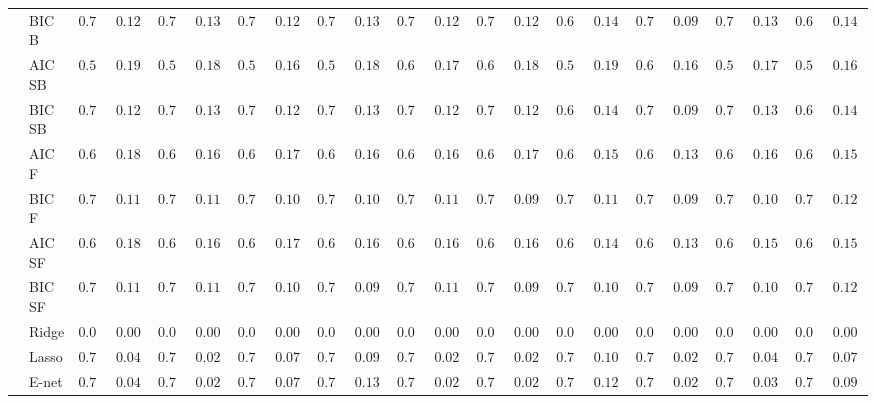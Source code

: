 \begin{tabular}{p{0.2cm}p{1cm}|p{0.6cm}p{0.6cm}|p{0.6cm}p{0.6cm}p{0.6cm}p{0.6cm}p{0.6cm}p{0.6cm}|p{0.6cm}p{0.6cm}p{0.6cm}p{0.6cm}p{0.6cm}p{0.6cm}|p{0.6cm}p{0.6cm}p{0.6cm}p{0.6cm}p{0.6cm}p{0.6cm}}
 & BIC B  & $0.720$ & $0.1271$ & $0.706$ & $0.1347$ & $0.700$ & $0.1287$ & $0.700$ & $0.1318$ & $0.740$ & $0.1223$ & $0.732$ & $0.1246$ & $0.690$ & $0.1432$ & $0.744$ & $0.0988$ & $0.706$ & $0.1347$ & $0.688$ & $0.1402$ \\
 & AIC SB  & $0.594$ & $0.1979$ & $0.578$ & $0.1883$ & $0.588$ & $0.1677$ & $0.590$ & $0.1829$ & $0.612$ & $0.1725$ & $0.634$ & $0.1821$ & $0.568$ & $0.1943$ & $0.642$ & $0.1615$ & $0.584$ & $0.1791$ & $0.588$ & $0.1629$ \\
 & BIC SB  & $0.720$ & $0.1271$ & $0.706$ & $0.1347$ & $0.700$ & $0.1287$ & $0.700$ & $0.1318$ & $0.740$ & $0.1223$ & $0.730$ & $0.1283$ & $0.690$ & $0.1432$ & $0.744$ & $0.0988$ & $0.704$ & $0.1348$ & $0.686$ & $0.1400$ \\
 & AIC F  & $0.620$ & $0.1853$ & $0.614$ & $0.1688$ & $0.620$ & $0.1764$ & $0.662$ & $0.1674$ & $0.624$ & $0.1615$ & $0.664$ & $0.1703$ & $0.654$ & $0.1500$ & $0.676$ & $0.1357$ & $0.642$ & $0.1615$ & $0.626$ & $0.1574$ \\
 & BIC F  & $0.734$ & $0.1174$ & $0.722$ & $0.1133$ & $0.734$ & $0.1066$ & $0.738$ & $0.1013$ & $0.750$ & $0.1115$ & $0.750$ & $0.0959$ & $0.724$ & $0.1129$ & $0.748$ & $0.0926$ & $0.738$ & $0.1013$ & $0.714$ & $0.1215$ \\
 & AIC SF  & $0.622$ & $0.1840$ & $0.616$ & $0.1674$ & $0.622$ & $0.1750$ & $0.664$ & $0.1630$ & $0.622$ & $0.1630$ & $0.666$ & $0.1683$ & $0.658$ & $0.1458$ & $0.678$ & $0.1330$ & $0.646$ & $0.1553$ & $0.628$ & $0.1558$ \\
 & BIC SF  & $0.734$ & $0.1174$ & $0.722$ & $0.1133$ & $0.734$ & $0.1066$ & $0.740$ & $0.0964$ & $0.750$ & $0.1115$ & $0.750$ & $0.0959$ & $0.726$ & $0.1088$ & $0.748$ & $0.0926$ & $0.738$ & $0.1013$ & $0.714$ & $0.1215$ \\
 & Ridge  & $0.000$ & $0.0000$ & $0.000$ & $0.0000$ & $0.000$ & $0.0000$ & $0.000$ & $0.0000$ & $0.000$ & $0.0000$ & $0.000$ & $0.0000$ & $0.000$ & $0.0000$ & $0.000$ & $0.0000$ & $0.000$ & $0.0000$ & $0.000$ & $0.0000$ \\
 & Lasso  & $0.794$ & $0.0445$ & $0.796$ & $0.0281$ & $0.778$ & $0.0746$ & $0.762$ & $0.0930$ & $0.798$ & $0.0200$ & $0.798$ & $0.0200$ & $0.756$ & $0.1085$ & $0.798$ & $0.0200$ & $0.788$ & $0.0477$ & $0.778$ & $0.0799$ \\
 & E-net  & $0.794$ & $0.0445$ & $0.796$ & $0.0281$ & $0.778$ & $0.0746$ & $0.740$ & $0.1318$ & $0.798$ & $0.0200$ & $0.796$ & $0.0281$ & $0.742$ & $0.1281$ & $0.798$ & $0.0200$ & $0.792$ & $0.0394$ & $0.772$ & $0.0944$ \\

\end{tabular}
